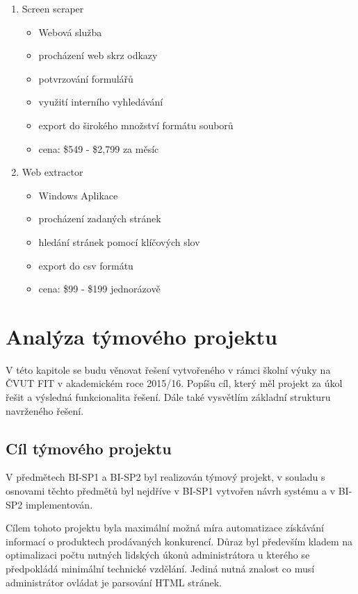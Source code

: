 \documentclass[thesis=B,czech]{FITthesis}[2012/06/26]
\begin{document}
\begin{enumerate}
\item Screen scraper \cite{ScreenScraper}

  \begin{itemize}
    \item Webová služba
    \item procházení web skrz odkazy
    \item potvrzování formulářů
    \item využití interního vyhledávání
    \item export do širokého množství formátu souborů
    \item cena: \$549 - \$2,799 za měsíc
  \end{itemize}
  
\item Web extractor \cite{WebExtractor}

  \begin{itemize}
    \item Windows Aplikace
    \item procházení zadaných stránek
    \item hledání stránek pomocí klíčových slov
    \item export do csv formátu
    \item cena: \$99 - \$199 jednorázově
  \end{itemize}


\end{enumerate}

\newpage

\chapter{Analýza týmového projektu}
V této kapitole se budu věnovat řešení vytvořeného v rámci školní výuky na ČVUT FIT v akademickém roce 2015/16.
Popíšu cíl, který měl projekt za úkol řešit a výsledná funkcionalita řešení. Dále také vysvětlím základní strukturu
navrženého řešení.

\section{Cíl týmového projektu}

V předmětech BI-SP1 a BI-SP2 byl realizován týmový projekt, v souladu s osnovami těchto předmětů byl nejdříve v BI-SP1 vytvořen návrh
systému a v BI-SP2 implementován.
\par
Cílem tohoto projektu byla maximální možná míra automatizace získávání informací o produktech prodávaných konkurencí. Důraz byl především kladem na optimalizaci počtu nutných lidských úkonů administrátora u kterého se předpokládá minimální technické vzdělání.
Jediná nutná znalost co musí administrátor ovládat je parsování HTML stránek.
\par
\end{document}
